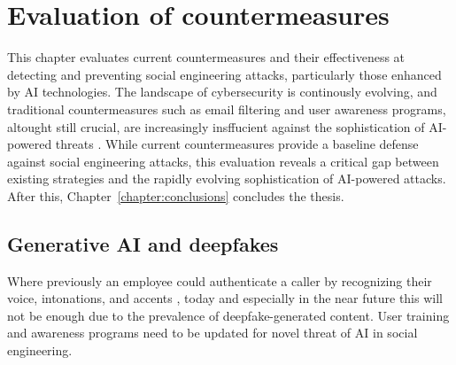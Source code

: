 


\chapter{Evaluation of countermeasures\label{chapter:evaluation}}
\begin{comment}

Guides:
    - Rest of the thesis (thesis max of 20 - other chapters and pages)
    - Fill the thesis with content in this chapter

TODO:
    [ ] 

What to cover:
    - OpenAI attempts to control how ChatGPT etc are used
    - Efficacy of EU and other level regulations
    - Instagram flagging content that might've been generated with AI (this is futile in the future?)
    
Literature:
    - 

\end{comment}

This chapter evaluates current countermeasures and their effectiveness at detecting and preventing social engineering attacks, particularly those enhanced by AI technologies. The landscape of cybersecurity is continously evolving, and traditional countermeasures such as email filtering and user awareness programs, altought still crucial, are increasingly insffucient against the sophistication of AI-powered threats \citep{fakhouriAIDrivenSolutionsForSocialEngineeringAttacks2024}. While current countermeasures provide a baseline defense against social engineering attacks, this evaluation reveals a critical gap between existing strategies and the rapidly evolving sophistication of AI-powered attacks. After this, Chapter~\ref{chapter:conclusions} concludes the thesis.













\section{Generative AI and deepfakes}
\begin{comment}    
    - Deepfake content detection
    - Spear phishing detection
\end{comment}

Where previously an employee could authenticate a caller by recognizing their voice, intonations, and accents \citep{mitnick_The_Art_of_Deception_2003}, today and especially in the near future this will not be enough due to the prevalence of deepfake-generated content. User training and awareness programs need to be updated for novel threat of AI in social engineering.



